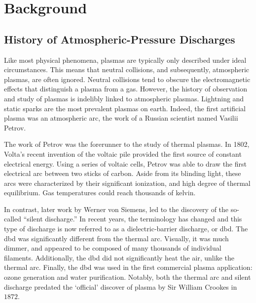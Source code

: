 \section{Background}

\subsection{History of Atmospheric-Pressure Discharges}

Like most physical phenomena, plasmas are typically only described under ideal
circumstances. This means that neutral collisions, and subsequently, atmospheric
plasmas, are often ignored. Neutral collisions tend to obscure the
electromagnetic effects that distinguish a plasma from a gas. However, the
history of observation and study of plasmas is indelibly linked to atmospheric
plasmas. Lightning and static sparks are the most prevalent plasmas on earth.
Indeed, the first artificial plasma was an atmospheric arc, the work of a
Russian scientist named Vasilii Petrov.

The work of Petrov was the forerunner to the study of thermal plasmas. In 1802,
Volta's recent invention of the voltaic pile provided the first source of
constant electrical energy. Using a series of voltaic cells, Petrov was able to
draw the first electrical arc between two sticks of carbon. Aside from its
blinding light, these arcs were characterized by their significant ionization,
and high degree of thermal equilibrium. Gas temperatures could reach thousands
of kelvin.

In contrast, later work by Werner von Siemens, led to the discovery of the
so-called ``silent discharge.'' In recent years, the terminology has changed and
this type of discharge is now referred to as a dielectric-barrier discharge, or
\acs{dbd}. The \acs{dbd} was significantly different from the thermal arc.
Visually, it was much dimmer, and appeared to be composed of many thousands of
individual filaments. Additionally, the \acs{dbd} did not significantly heat the
air, unlike the thermal arc. Finally, the \acs{dbd} was used in the first
commercial plasma application: ozone generation and water purification. Notably,
both the thermal arc and silent discharge predated the `official' discover of
plasma by Sir William Crookes in $1872$.


